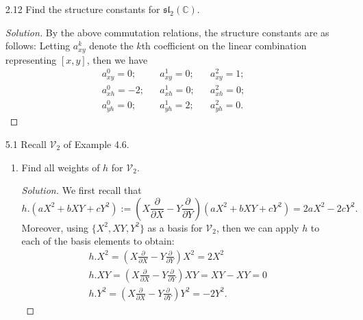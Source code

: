 \documentclass[12pt]{article}
\theoremstyle{definition}
\theoremstyle{definition}
\newenvironment{solution}
  {\renewcommand\qedsymbol{$\blacksquare$}\begin{proof}[Solution]}
  {\end{proof}}
\begin{document}
\begin{enumerate}
\begin{proof}
            \end{proof}
        \item[2.12] Find the structure constants for
            $\mathfrak{sl}_{2}(\mathbb{C})$.
            \begin{solution}
                By the above commutation relations, the structure constants are
                as follows: Letting $a_{xy}^k$ denote the $k$th coefficient on
                the linear combination representing $[x, y]$, then we have
                \begin{align*}
                    &a_{xy}^0=0;& &a_{xy}^1=0;& &a_{xy}^2=1; \\
                    &a_{xh}^0=-2;& &a_{xh}^1=0;& &a_{xh}^2=0; \\
                    &a_{yh}^0=0;& &a_{yh}^1=2;& &a_{yh}^2=0.
                \end{align*}
            \end{solution}
        \item[5.1] Recall $\mathcal{V}_2$ of Example 4.6.
            \begin{enumerate}
                \item Find all weights of $h$ for $\mathcal{V}_2$.
                    \begin{solution}
                        We first recall that  
                        \begin{equation*}
                            h.(aX^2+bXY+cY^2):=(X\frac{\partial}{\partial
                            X}-Y\frac{\partial}{\partial
                        Y})(aX^2+bXY+cY^2)=2aX^2-2cY^2.
                        \end{equation*}
                        Moreover, using $\{X^2, XY, Y^2\}$ as a basis for
                        $\mathcal{V}_2$, then we can apply $h$ to each of the
                        basis elements to obtain:
                            \begin{align*}
                                &h.X^2 = (X\frac{\partial}{\partial
                                X}-Y\frac{\partial}{\partial Y})X^2 =2X^2& \\
                                &h.XY = (X\frac{\partial}{\partial
                                X}-Y\frac{\partial}{\partial Y})XY =XY-XY=0& \\
                                &h.Y^2 = (X\frac{\partial}{\partial
                                X}-Y\frac{\partial}{\partial Y})Y^2=-2Y^2.
                            \end{align*}

\end{solution}
\end{enumerate}
\end{enumerate}
\end{document}
